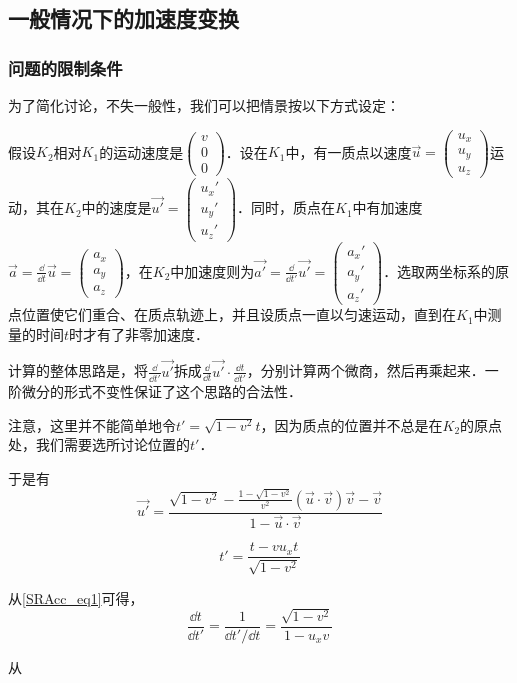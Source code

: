 

\subsection{一般情况下的加速度变换}
\subsubsection{问题的限制条件}

为了简化讨论，不失一般性，我们可以把情景按以下方式设定：

假设$K_2$相对$K_1$的运动速度是$\left(\begin{matrix}v\\0\\0\end{matrix} \right) $．设在$K_1$中，有一质点以速度$\vec{u}=\left(\begin{matrix}u_x\\u_y\\u_z\end{matrix} \right) \tag{2}$运动，其在$K_2$中的速度是$\vec{u'}=\left(\begin{matrix}u_x'\\u_y'\\u_z'\end{matrix} \right) $．同时，质点在$K_1$中有加速度$\vec{a}=\frac{\dd}{\dd{t}}\vec{u}=\left(\begin{matrix}a_x\\a_y\\a_z\end{matrix} \right)$，在$K_2$中加速度则为$\vec{a'}=\frac{\dd}{\dd{t'}}\vec{u'}=\left(\begin{matrix}a_x'\\a_y'\\a_z'\end{matrix} \right)$．选取两坐标系的原点位置使它们重合、在质点轨迹上，并且设质点一直以匀速运动，直到在$K_1$中测量的时间$t$时才有了非零加速度．

计算的整体思路是，将$\frac{\dd}{\dd{t'}}\vec{u'}$拆成$\frac{\dd}{\dd{t}}\vec{u'}\cdot\frac{\dd{t}}{\dd{t'}}$，分别计算两个微商，然后再乘起来．一阶微分的形式不变性保证了这个思路的合法性．

注意，这里并不能简单地令$t'=\sqrt{1-v^2}t$，因为质点的位置并不总是在$K_2$的原点处，我们需要选所讨论位置的$t'$．

于是有
\begin{equation}\label{SRAcc_eq2}
\vec{u'}=\frac{\sqrt{1-v^2}-\frac{1-\sqrt{1-v^2}}{v^2}(\vec{u}\cdot\vec{v})\vec{v}-\vec{v}}{1-\vec{u}\cdot\vec{v}}
\end{equation}

\begin{equation}\label{SRAcc_eq1}
t'=\frac{t-vu_xt}{\sqrt{1-v^2}}
\end{equation}

从\autoref{SRAcc_eq1}可得，
\begin{equation}
\frac{\dd t}{\dd t'}=\frac{1}{\dd t'/\dd t}=\frac{\sqrt{1-v^2}}{1-u_xv}
\end{equation}

从

